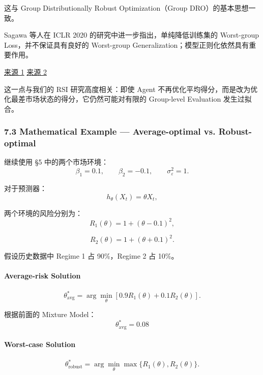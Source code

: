 这与 Group Distributionally Robust Optimization（Group DRO）的基本思想一致。

Sagawa 等人在 ICLR 2020 的研究中进一步指出，单纯降低训练集的 Worst-group Loss，并不保证具有良好的 Worst-group Generalization；模型正则化依然具有重要作用。

\href{https://arxiv.org/abs/1911.08731}{来源 1} \href{https://mlanthology.org/iclr/2020/sagawa2020iclr-distributionally/}{来源 2}

这一点与我们的 RSI 研究高度相关：即使 Agent 不再优化平均得分，而是改为优化最差市场状态的得分，它仍然可能对有限的 Group-level Evaluation 发生过拟合。

\hypertarget{part-4-77-0001-mathematical-example-average-optimal-vs.-robust-optimal}{%
\subsubsection{7.3 Mathematical Example --- Average-optimal vs. Robust-optimal}\label{part-4-77-0001-mathematical-example-average-optimal-vs.-robust-optimal}}

继续使用 §5 中的两个市场环境：
\[\beta_1=0.1,\qquad
\beta_2=-0.1,
\qquad
\sigma_\varepsilon^2=1.\]

对于预测器：
\[h_\theta(X_t)=\theta X_t,\]

两个环境的风险分别为：
\[R_1(\theta)=1+(\theta-0.1)^2,\]

\[R_2(\theta)=1+(\theta+0.1)^2.\]

假设历史数据中 Regime 1 占 90\%，Regime 2 占 10\%。

\hypertarget{part-4-77-0001-average-risk-solution}{%
\paragraph{Average-risk Solution}\label{part-4-77-0001-average-risk-solution}}

\[\theta_{\mathrm{avg}}^*
=
\arg\min_\theta
[0.9R_1(\theta)+0.1R_2(\theta)].\]

根据前面的 Mixture Model：
\[\boxed{
\theta_{\mathrm{avg}}^*=0.08
}\]

\hypertarget{part-4-77-0001-worst-case-solution}{%
\paragraph{Worst-case Solution}\label{part-4-77-0001-worst-case-solution}}

\[\theta_{\mathrm{robust}}^*
=
\arg\min_\theta
\max\{R_1(\theta),R_2(\theta)\}.\]

